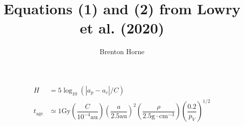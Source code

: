 \documentclass[12pt,a4paper,openright]{article}
\title{Equations (1) and (2) from Lowry et al. (2020)}
\author{Brenton Horne}
\begin{document}
\begin{align}
    H &= 5\log_{10}{(|a_p-a_c|/C)} \\
    t_{\mathrm{age}} &\simeq 1\mathrm{Gy}\left(\dfrac{C}{10^{-4}\mathrm{au}}\right) \left(\dfrac{a}{2.5\mathrm{au}}\right)^2 \left(\dfrac{\rho}{2.5 \mathrm{g}\cdot \mathrm{cm}^{-3}}\right)\left(\dfrac{0.2}{p_V}\right)^{1/2}
\end{align}
\end{document}
